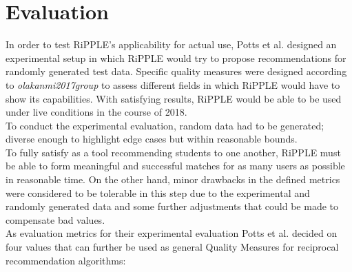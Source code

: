 \documentclass[nochapterpage,bigchapter,linedtoc,longdoc,colorback,accentcolor=tud3b,oneside]{tudreport}
\begin{document}
\section{Evaluation}\label{paper:evaluation}
In order to test RiPPLE's applicability for actual use, Potts et al. designed an experimental setup in which RiPPLE would try to propose recommendations for randomly generated test data. Specific quality measures were designed according to \textit{olakanmi2017group} to assess different fields in which RiPPLE would have to show its capabilities. With satisfying results, RiPPLE would be able to be used under live conditions in the course of 2018.\\
To conduct the experimental evaluation, random data had to be generated; diverse enough to highlight edge cases but within reasonable bounds.\\ 
To fully satisfy as a tool recommending students to one another, RiPPLE must be able to form meaningful and successful matches for as many users as possible in reasonable time. On the other hand, minor drawbacks in the defined metrics were considered to be tolerable in this step due to the experimental and randomly generated data and some further adjustments that could be made to compensate bad values.\\
As evaluation metrics for their experimental evaluation Potts et al. decided on four values that can further be used as general Quality Measures for reciprocal recommendation algorithms:\\
\end{document}
